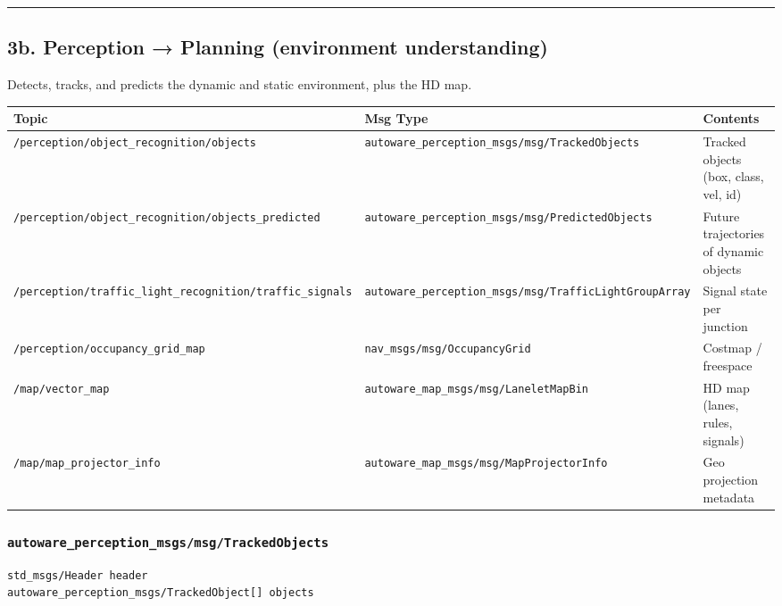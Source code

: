 \documentclass[
]{article}
\begin{document}
\begin{center}\rule{0.5\linewidth}{0.5pt}\end{center}

\subsection{3b. Perception → Planning (environment
understanding)}\label{3b-perception--planning-environment-understanding}

Detects, tracks, and predicts the dynamic and static environment, plus
the HD map.

\begin{longtable}[]{@{}lll@{}}
\toprule\noalign{}
Topic & Msg Type & Contents \\
\midrule\noalign{}
\endhead
\bottomrule\noalign{}
\endlastfoot
\texttt{/perception/object\_recognition/objects} &
\texttt{autoware\_perception\_msgs/msg/TrackedObjects} & Tracked objects
(box, class, vel, id) \\
\texttt{/perception/object\_recognition/objects\_predicted} &
\texttt{autoware\_perception\_msgs/msg/PredictedObjects} & Future
trajectories of dynamic objects \\
\texttt{/perception/traffic\_light\_recognition/traffic\_signals} &
\texttt{autoware\_perception\_msgs/msg/TrafficLightGroupArray} & Signal
state per junction \\
\texttt{/perception/occupancy\_grid\_map} &
\texttt{nav\_msgs/msg/OccupancyGrid} & Costmap / freespace \\
\texttt{/map/vector\_map} &
\texttt{autoware\_map\_msgs/msg/LaneletMapBin} & HD map (lanes, rules,
signals) \\
\texttt{/map/map\_projector\_info} &
\texttt{autoware\_map\_msgs/msg/MapProjectorInfo} & Geo projection
metadata \\
\end{longtable}

\subsubsection{\texorpdfstring{\texttt{autoware\_perception\_msgs/msg/TrackedObjects}}{autoware\_perception\_msgs/msg/TrackedObjects}}\label{autoware_perception_msgsmsgtrackedobjects}

\begin{verbatim}
std_msgs/Header header
autoware_perception_msgs/TrackedObject[] objects
\end{verbatim}
\end{document}

